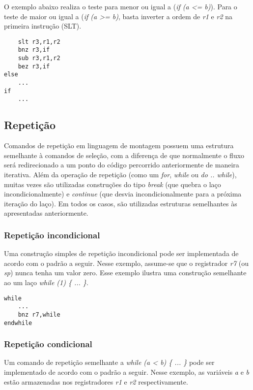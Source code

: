 \documentclass{extreport}
\begin{document}
O exemplo abaixo realiza o teste para menor ou igual a (\textit{if (a <= b)}). Para o teste de maior ou igual a (\textit{if (a >= b)}, basta inverter a ordem de \textit{r1} e \textit{r2} na primeira instrução (SLT).

\begin{verbatim}
    slt r3,r1,r2
    bnz r3,if
    sub r3,r1,r2
    bez r3,if
else
    ...
if
    ...
\end{verbatim}

\subsection{Repetição}

Comandos de repetição em linguagem de montagem possuem uma estrutura semelhante à comandos de seleção, com a diferença de que normalmente o fluxo será redirecionado a um ponto do código percorrido anteriormente de maneira iterativa. Além da operação de repetição (como um \textit{for}, \textit{while} ou \textit{do .. while}), muitas vezes são utilizadas construções do tipo \textit{break} (que quebra o laço incondicionalmente) e \textit{continue} (que desvia incondicionalmente para a próxima iteração do laço). Em todos os casos, são utilizadas estruturas semelhantes às apresentadas anteriormente.

\subsubsection{Repetição incondicional}

Uma construção simples de repetição incondicional pode ser implementada de acordo com o padrão a seguir. Nesse exemplo, assume-se que o registrador \textit{r7} (ou \textit{sp}) nunca tenha um valor zero. Esse exemplo ilustra uma construção semelhante ao um laço \textit{while (1) \{ ... \}}.

\begin{verbatim}
while
    ...
    bnz r7,while
endwhile
\end{verbatim}

\subsubsection{Repetição condicional}

Um comando de repetição semelhante a \textit{while (a < b) \{ ... \}} pode ser implementado de acordo com o padrão a seguir. Nesse exemplo, as variáveis \textit{a} e \textit{b} estão armazenadas nos registradores \textit{r1} e \textit{r2} respectivamente.
\end{document}
